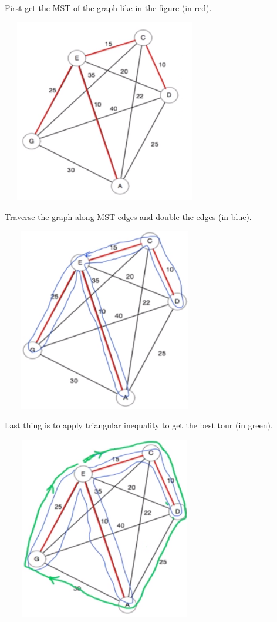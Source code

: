 \documentclass[12pt]{article}
\begin{document}
First get the MST of the graph like in the figure (in red).\\
\begin{center}
	\includegraphics[width=9cm,height=8cm]{./assets/example/graph-dftt-2.png}\\
\end{center}
Traverse the graph along MST edges and double the edges (in blue).\\
\begin{center}
	\includegraphics[width=9cm,height=8cm]{./assets/example/graph-dftt-3.png}\\
\end{center}
Last thing is to apply triangular inequality to get the best tour (in green).\\
\begin{center}
	\includegraphics[width=9cm,height=8cm]{./assets/example/graph-dftt-4.png}\\
\end{center}
\end{document}
